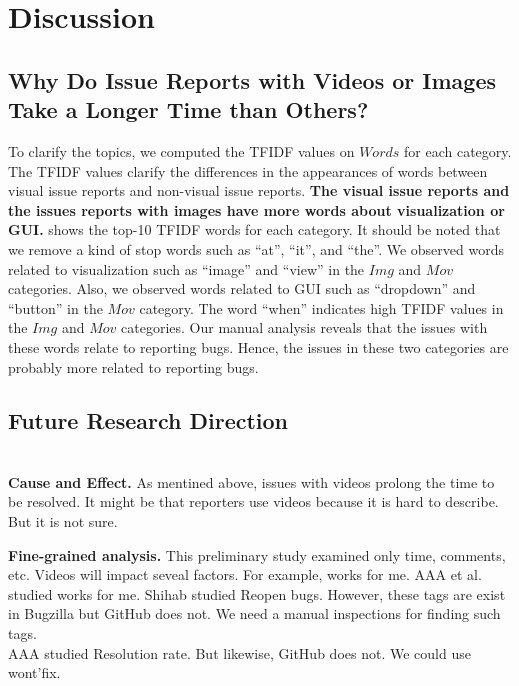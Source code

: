\section{Discussion}
%

\subsection{Why Do Issue Reports with Videos or Images Take a Longer Time than Others?}
To clarify the topics, we computed the TFIDF values 
on $Words$ for each category. 
The TFIDF values clarify the differences in the appearances of 
words between visual issue reports and 
non-visual issue reports. 
\textbf{The visual issue reports and the issues 
reports with images have more words 
about visualization or GUI.}
 shows the top-10 TFIDF words
for each category.
It should be noted that we remove a kind of stop words such as 
``at'', ``it'', and ``the''. 
We observed words related to visualization such as 
``image'' and ``view'' in the $Img$ and $Mov$ categories. 
Also, we observed words related to GUI such as 
``dropdown'' and ``button'' in the $Mov$ category. 
The word ``when'' indicates high TFIDF values 
in the $Img$ and $Mov$ categories. 
Our manual analysis reveals that the issues with 
these words relate to reporting bugs. 
Hence, the issues in these two categories are 
probably more related to reporting bugs. 


\subsection{Future Research Direction}
\\

\noindent
\textbf{Cause and Effect. }
As mentined above, issues with videos prolong the time to be resolved. It might be that reporters use videos because it is hard to describe. But it is not sure. 

\noindent
\textbf{Fine-grained analysis. }
This preliminary study examined only time, comments, etc. Videos will impact seveal factors. For example, works for me. AAA et al. studied works for me. Shihab studied Reopen bugs. However, these tags are exist in Bugzilla  but GitHub does not. We need a manual inspections for finding such tags. 
\\
AAA studied Resolution rate. But likewise, GitHub does not. We could use wont'fix. 


